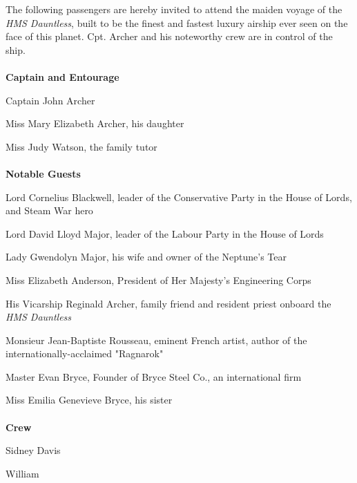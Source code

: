 \documentclass[white]{airship}
\begin{document}
\name{\wListOfPassengers{}} %

The following passengers are hereby invited to attend the maiden voyage of the {\it HMS Dauntless}, built to be the finest and fastest luxury airship ever seen on the face of this planet. Cpt. Archer and his noteworthy crew are in control of the ship.
\\
\\
{\bf Captain and Entourage}

Captain John Archer

Miss Mary Elizabeth Archer, his daughter

Miss Judy Watson, the family tutor
\\
\\
{\bf Notable Guests}

Lord Cornelius Blackwell, leader of the Conservative Party in the House of Lords, and Steam War hero

Lord David Lloyd Major, leader of the Labour Party in the House of Lords

Lady Gwendolyn Major, his wife and owner of the Neptune's Tear

Miss Elizabeth Anderson, President of Her Majesty's Engineering Corps

His Vicarship Reginald Archer, family friend and resident priest onboard the {\it HMS Dauntless}

Monsieur Jean-Baptiste Rousseau, eminent French artist, author of the internationally-acclaimed "Ragnarok"

Master Evan Bryce, Founder of Bryce Steel Co., an international firm

Miss Emilia Genevieve Bryce, his sister
\\
\\
{\bf Crew}

Sidney Davis

William
\end{document}
